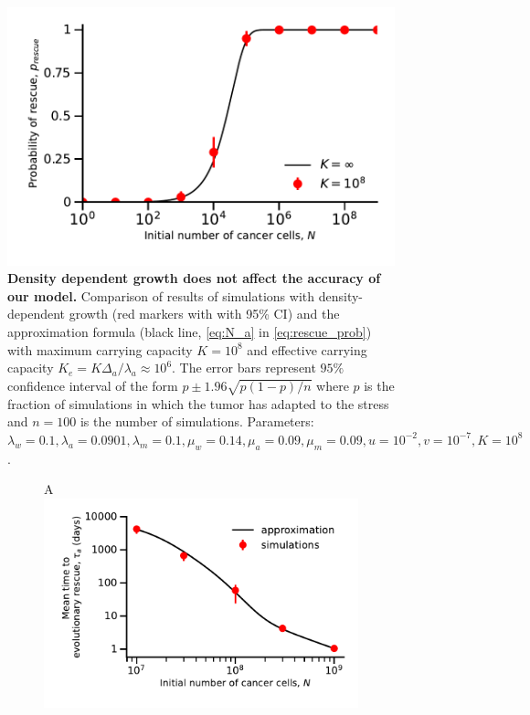 \documentclass[12pt]{extarticle}
\begin{document}
\begin{appendices}
\begin{figure}[h]
\vspace*{1\baselineskip}
\includegraphics[width=1\textwidth]{Figures/SurvPlotNDataLogisticK.pdf}
\caption{\textbf{Density dependent growth does not affect the accuracy of our model.} Comparison of results of simulations  with density-dependent growth (red markers with with 95\% CI) and the approximation formula (black line, \cref{eq:N_a} in \cref{eq:rescue_prob}) with maximum carrying capacity $K=10^8$ and effective carrying capacity $K_e=K\Delta_a/\lambda_a\approx10^6$. The error bars represent $95\%$ confidence interval of the form $p\pm1.96\sqrt{p\left(1-p\right)/n}$ where $p$ is the  fraction of simulations in which the tumor has adapted to the stress and $n=100$ is the number of simulations. Parameters: $\lambda_w=0.1,\lambda_a=0.0901,\lambda_m=0.1,\mu_w=0.14,\mu_a=0.09,\mu_m=0.09, u=10^{-2}, v=10^{-7}, K=10^8$.}
\label{LogisticPlot}
\end{figure}
\begin{figure}[!htb]
\begin{subfigure}{0.5\textwidth}
A\\
\includegraphics[width=1\textwidth]{Figures/EvolutionaryRescueTime.pdf}

\end{subfigure}
\end{figure}
\end{appendices}
\end{document}

